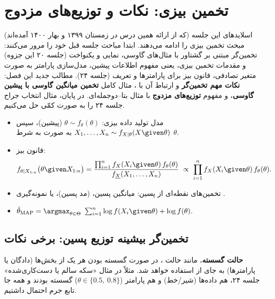 \chapter{تخمین بیزی: نکات  و توزیع‌های مزدوج}

اسلایدهای این جلسه (که از ارائه همین درس در زمستان ۱۳۹۹ و بهار ۱۴۰۰ آمده‌اند) مبحث تخمین بیزی را ادامه می‌دهند. ابتدا مباحث جلسه قبل خود را مرور می‌کنند: تخمین‌گر مبتنی بر گشتاور  با مثال‌های گاوسی، نمایی و یکنواخت (جلسه ۲۰ این جزوه) و مقدمات تخمین بیزی، یعنی مفهوم اطلاعات پیشین، مدل‌سازی پارامتر به صورت متغیر تصادفی، قانون بیز برای پارامترها و تعریف  (جلسه ۲۴). مطالب جدید این فصل: \textbf{نکات مهم تخمین‌گر } و ارتباط آن با ، مثال کامل \textbf{تخمین میانگین گاوسی با پیشین گاوسی}، و مفهوم \textbf{توزیع‌های مزدوج } با مثال بتا--دوجمله‌ای. در پایان، مثال انتخاب جراح جلسه ۲۴ را به صورت کمّی حل می‌کنیم.

\begin{summarybox}
\begin{itemize}
\item مدل تولید داده بیزی: $\theta\sim f_\theta(\theta)$ (پیشین)، سپس $X_1,\ldots,X_n\sim f_{X|\theta}(X\given\theta)$ به صورت  به شرط $\theta$.
\item قانون بیز:
\[
f_{\theta|X_{1:n}}\big(\theta\given X_{1:n}\big)=\frac{\prod_{i=1}^nf_X(X_i\given\theta)\,f_\theta(\theta)}{f_{\underline X}(X_1,\ldots,X_n)}\ \propto\ \prod_{i=1}^nf_X(X_i\given\theta)\,f_\theta(\theta).
\]
\item تخمین‌های نقطه‌ای از پسین: میانگین پسین،  (مد پسین)، یا نمونه‌گیری .
\item $\hat\theta_{\mathrm{MAP}}=\argmax_{\theta\in\Theta}\ \sum_{i=1}^n\log f(X_i\given\theta)+\log f(\theta)$.
\end{itemize}
\end{summarybox}

\section{تخمین‌گر بیشینه توزیع پسین: برخی نکات}

\begin{note}
\notetitle \textbf{حالت گسسته.} مانند حالت ، در صورت گسسته بودن هر یک از بخش‌ها (دادگان یا پارامترها) به جای  از  استفاده خواهد شد. مثلاً در مثال «سکه سالم یا دست‌کاری‌شده» جلسه ۲۴، هم داده‌ها (شیر/خط) و هم پارامتر ($\theta\in\{0.5,\ 0.8\}$) گسسته بودند و همه جا تابع جرم احتمال داشتیم.
\end{note}

